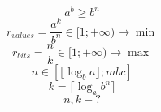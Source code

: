 \documentclass{minimal}
\begin{document}
$$a^b \geq b^n$$
$$r_{values} = \frac{a^k}{b^n} \in [1; +\infty) \rightarrow \min$$
$$r_{bits} = \frac{n}{k} \in [1; +\infty) \rightarrow \max$$
$$n \in [\lfloor \log_b a \rfloor; mbc]$$
$$k = \lceil \log_a b^n \rceil$$
$$n, k - ?$$
\end{document}
